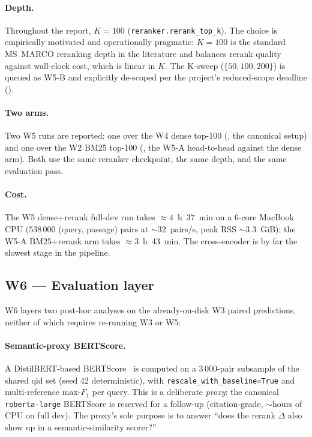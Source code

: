\documentclass[11pt,a4paper]{article}
\newcommand{\msmarco}{MS~MARCO}
\newcommand{\bertscore}{BERTScore}
\newcommand{\bmtwofive}{BM25}
\begin{document}
\paragraph{Depth.}  Throughout the report, $K\!=\!100$
(\texttt{reranker.rerank\_top\_k}).  The choice is empirically
motivated and operationally pragmatic: $K\!=\!100$ is the standard
\msmarco{} reranking depth in the literature and balances rerank
quality against wall-clock cost, which is linear in $K$.  The
K-sweep ($\{50, 100, 200\}$) is queued as W5-B and explicitly
de-scoped per the project's reduced-scope deadline
().

\paragraph{Two arms.}  Two W5 runs are reported: one over the W4
dense top-100 (, the canonical setup) and
one over the W2 \bmtwofive{} top-100 (, the W5-A
head-to-head against the dense arm).  Both use the same reranker
checkpoint, the same depth, and the same evaluation pass.

\paragraph{Cost.}  The W5 dense+rerank full-dev run takes
$\approx\!4$~h~$37$~min on a 6-core MacBook CPU
(538\,000 (query, passage) pairs at $\sim\!32$~pairs/s, peak RSS
$\sim\!3.3$~GiB); the W5-A \bmtwofive{}+rerank arm takes
$\approx\!3$~h~$43$~min.  The cross-encoder is by far the slowest
stage in the pipeline.

\subsection{W6 --- Evaluation layer}
\label{sec:w6-method}

W6 layers two post-hoc analyses on the already-on-disk W3 paired
predictions, neither of which requires re-running W3 or W5:

\paragraph{Semantic-proxy \bertscore{}.}  A DistilBERT-based
\bertscore{}~\cite{zhang2020bertscore,sanh2019distilbert} is
computed on a 3\,000-pair subsample of the shared qid set
(seed 42 deterministic), with
\texttt{rescale\_with\_baseline=True} and multi-reference max-$F_1$
per query.  This is a deliberate \emph{proxy}: the canonical
\texttt{roberta-large} \bertscore{} is reserved for a follow-up
(citation-grade, $\sim\!$hours of CPU on full dev).  The proxy's
sole purpose is to answer ``does the rerank $\Delta$ also show up in
a semantic-similarity scorer?''
\end{document}
